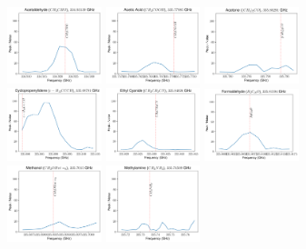 \documentclass[12pt]{article}
\begin{document}
\begin{figure}
\includegraphics[width=0.245\textwidth]{spw2_CH3CHO}
\includegraphics[width=0.245\textwidth]{spw2_CH3COOH}
\includegraphics[width=0.245\textwidth]{spw2_(CH3)2CO}
\includegraphics[width=0.245\textwidth]{spw2_c-H13CCCH}
\includegraphics[width=0.245\textwidth]{spw2_CH3CH2CN}
\includegraphics[width=0.245\textwidth]{spw2_H2C18O}
\includegraphics[width=0.245\textwidth]{spw2_CH3OHvt=0}
\includegraphics[width=0.245\textwidth]{spw2_CH3NH2}

\end{figure}
\end{document}

